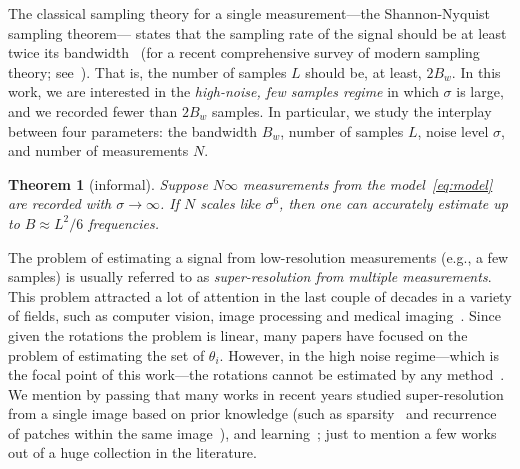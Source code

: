 \documentclass[english,12pt]{article}
\newcommand{\tB}{B_w}
\newcommand{\SR}{super-resolution }
\newtheorem{thm}{Theorem}
\numberwithin{equation}{section}
\numberwithin{thm}{section} %
\begin{document}
The classical sampling theory for a single measurement---the Shannon-Nyquist sampling theorem--- states that the sampling rate of the signal should be at least twice its bandwidth~\cite{shannon1949communication} (for a recent comprehensive survey of modern sampling theory; see~\cite{eldar2015sampling}).
That is, the number of samples $L$ should be, at least, $2\tB$. 
In this work, we are interested in  the \emph{high-noise, few samples regime}  in which $\sigma$ is large, and  we recorded  fewer than $2\tB$ samples. In particular, we study the interplay between four parameters: the bandwidth $\tB$, number of samples $L$, noise level $\sigma$, and number of measurements $N$. 

\begin{thm}[informal]
	Suppose $N\infty$ measurements from the model~\eqref{eq:model} are recorded with $\sigma\to\infty$. If $N$ scales like $\sigma^6$, then one can accurately estimate up to $B\approx L^2/6$ frequencies. 
\end{thm}

The problem of estimating a signal from low-resolution measurements (e.g., a few samples) is usually referred to as \emph{super-resolution from multiple measurements}. This problem attracted a lot of attention in the last couple of decades in a variety of fields, such as computer vision, image processing and medical imaging~\cite{park2003super,farsiu2004advances, greenspan2008super}.
Since given the rotations the problem is linear, many papers have focused on the problem of estimating the set of $\theta_i$. However, in the high noise regime---which is the focal point of this work---the rotations cannot be estimated by any method~\cite{bendory2018toward,aguerrebere2016fundamental}. 
We mention by passing that many works in recent years studied super-resolution from a single image based on prior knowledge (such as sparsity~\cite{huang2009super,candes2014towards} and recurrence of patches within the same image~\cite{glasner2009super}),
and learning~\cite{lim2017enhanced}; just to mention a few works out of a huge collection in the literature. 
\end{document}
